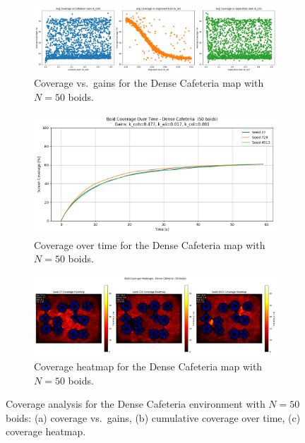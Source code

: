 \documentclass[12pt]{article}
\begin{document}
\begin{figure}[h!]
  \centering
  \begin{subfigure}[b]{0.32\linewidth}
    \includegraphics[width=\linewidth]{cov_vs_gains/dense_50.png}
    \caption{Coverage vs.~gains for the Dense Cafeteria map with $N=50$ boids.}
    \label{fig:app:dense50_gains}
  \end{subfigure}\hfill
  \begin{subfigure}[b]{0.32\linewidth}
    \includegraphics[width=\linewidth]{optimal_cov_vs_time/dense_50.png}
    \caption{Coverage over time for the Dense Cafeteria map with $N=50$ boids.}
    \label{fig:app:dense50_time}
  \end{subfigure}\hfill
  \begin{subfigure}[b]{0.32\linewidth}
    \includegraphics[width=\linewidth]{heatmaps/dense_50.png}
    \caption{Coverage heatmap for the Dense Cafeteria map with $N=50$ boids.}
    \label{fig:app:dense50_heat}
  \end{subfigure}
  \caption{Coverage analysis for the Dense Cafeteria environment with $N=50$ boids: (a) coverage vs.~gains, (b) cumulative coverage over time, (c) coverage heatmap.}
  \label{fig:app:densecaf50}
\end{figure}
\end{document}
